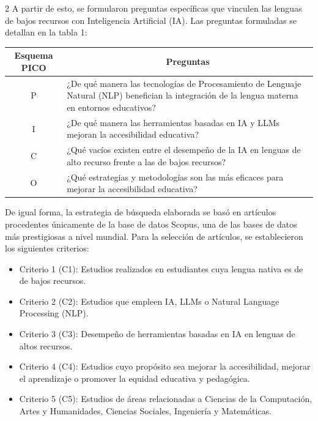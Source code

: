 \documentclass[12pt,twoside,titlepage]{ingenius}
\begin{document}
\begin{multicols}{2}
A partir de esto, se formularon preguntas específicas que vinculen las lenguas de bajos recursos con Inteligencia Artificial (IA). Las preguntas formuladas se detallan en la tabla 1:


\begin{table}[H]
\centering
{}
\small
    \begin{tabular}{cp{4.6cm}}
    \toprule
    \multicolumn{1}{c}{\textbf{Esquema PICO}} & \multicolumn{1}{c}{\textbf{Preguntas}} \\
    \midrule
    P & ¿De qué manera las tecnologías de Procesamiento de Lenguaje Natural (NLP) benefician la integración de la lengua materna en entornos educativos? \\ \addlinespace
    I & ¿De qué manera las herramientas basadas en IA y LLMs mejoran la accesibilidad educativa? \\ \addlinespace
    C & ¿Qué vacíos existen entre el desempeño de la IA en lenguas de alto recurso frente a las de bajos recursos? 
 \\ \addlinespace
    O & ¿Qué estrategias y metodologías son las más eficaces para mejorar la accesibilidad educativa?
 \\
    \bottomrule
    \end{tabular}%
  \label{tabla1}%
\end{table}


De igual forma, la estrategia de búsqueda elaborada se basó en artículos procedentes únicamente de la base de datos Scopus, una de las bases de datos más prestigiosas a nivel mundial. Para la selección de artículos, se establecieron los siguientes criterios:

\begin{itemize}
   \item Criterio 1 (C1): Estudios realizados en estudiantes cuya lengua nativa es de de bajos recursos.
   \item Criterio 2 (C2): Estudios que empleen IA, LLMs o Natural Language Processing (NLP).
   \item Criterio 3 (C3): Desempeño de herramientas basadas en IA en lenguas de altos recursos.
   \item Criterio 4 (C4): Estudios cuyo propósito sea mejorar la accesibilidad, mejorar el aprendizaje o promover la equidad educativa y pedagógica.
   \item Criterio 5 (C5): Estudios de áreas relacionadas a Ciencias de la Computación, Artes y Humanidades, Ciencias Sociales, Ingeniería y Matemáticas.
\end{itemize}



\end{multicols}
\end{document}
